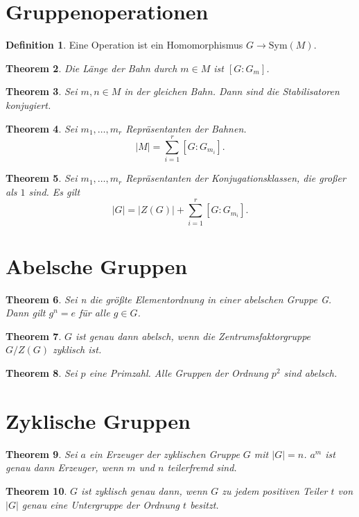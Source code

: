\documentclass[prb,12pt]{revtex4-2}
\newtheorem{Theorem}{Theorem}
\theoremstyle{definition}
\theoremstyle{definition}
\newtheorem{Definition}[Theorem]{Definition}
\begin{document}
	\section{Gruppenoperationen}
	\begin{Definition}
		Eine Operation ist ein Homomorphismus $G\to \text{Sym}(M)$.
	\end{Definition}
	\begin{Theorem}
		Die Länge der Bahn durch $m\in M$ ist $[G : G_m]$.
	\end{Theorem}
	\begin{Theorem}
		Sei $m,n\in M$ in der gleichen Bahn. Dann sind die Stabilisatoren konjugiert.
	\end{Theorem}
	\begin{Theorem}
		Sei $m_1,\dots, m_r$ Repräsentanten der Bahnen.
		\[
			|M|=\sum_{i=1}^r [G:G_{m_i}]
		.\] 
	\end{Theorem}
	\begin{Theorem}
		Sei $m_1,\dots, m_r$ Repräsentanten der Konjugationsklassen, die großer als $1$ sind. Es gilt
		\[
			|G|=|Z(G)|+\sum_{i=1}^r [G:G_{m_i}]
		.\] 
	\end{Theorem}
	\section{Abelsche Gruppen}
\begin{Theorem}
Sei n die größte Elementordnung in einer abelschen Gruppe G. Dann gilt $g^n = e$ für alle $g \in G$.	
\end{Theorem}
\begin{Theorem}
	$G$ ist genau dann abelsch, wenn die Zentrumsfaktorgruppe $G / Z(G)$ zyklisch ist.
\end{Theorem}
\begin{Theorem}
	Sei $p$ eine Primzahl. Alle Gruppen der Ordnung $p^2$ sind abelsch.
\end{Theorem}
	\section{Zyklische Gruppen}
	\begin{Theorem}
		Sei $a$ ein Erzeuger der zyklischen Gruppe $G$ mit $|G|=n$. $a^m$ ist genau dann Erzeuger, wenn $m$ und $n$ teilerfremd sind.
	\end{Theorem}
	\begin{Theorem}
		$G$ ist zyklisch genau dann, wenn $G$ zu jedem positiven Teiler $t$ von $|G|$ genau eine Untergruppe der Ordnung $t$ besitzt.
	\end{Theorem}
\end{document}
